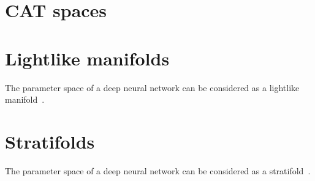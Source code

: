 \documentclass[11pt]{article}
\begin{document}
\section*{CAT spaces}

\section*{Lightlike manifolds}

The parameter space of a deep neural network can be considered as a lightlike manifold~\cite{sun2019geometric}.

\section*{Stratifolds}

The parameter space of a deep neural network can be considered as a stratifold~\cite{esser2022influence}.



\end{document}

